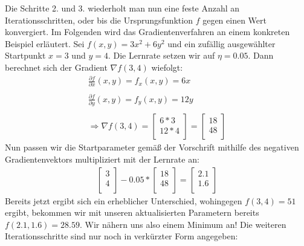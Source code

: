   \bigbreak\noindent
  Die Schritte 2. und 3. wiederholt man nun eine feste Anzahl an Iterationsschritten, oder bis die Ursprungsfunktion $f$ gegen einen Wert konvergiert.
  \bigbreak\noindent
  Im Folgenden wird das Gradientenverfahren an einem konkreten Beispiel erläutert.
  Sei $f(x,y) = 3x^2 + 6y^2$ und ein zufällig ausgewählter Startpunkt $x = 3$ und $y = 4$. 
  Die Lernrate setzen wir auf $\eta = 0.05$. Dann berechnet sich der Gradient $\nabla f(3,4)$ wiefolgt: 
  \begin{align*}
    \frac{\partial f}{\partial x}(x,y) = f_{x}(x,y) = 6x\\
    \\
    \frac{\partial f}{\partial y}(x,y) = f_{y}(x,y) = 12y\\
    \\
    \Rightarrow \nabla f(3,4) = \begin{bmatrix}
      6 * 3\\
      12 * 4\\
    \end{bmatrix} = \begin{bmatrix}
      18\\
      48\\
    \end{bmatrix}
  \end{align*}
  Nun passen wir die Startparameter gemäß der Vorschrift mithilfe des negativen Gradientenvektors multipliziert mit der Lernrate an: 
  \begin{align*}
    \begin{bmatrix}
      3\\
      4\\
    \end{bmatrix} - 0.05 * \begin{bmatrix}
      18\\
      48\\
    \end{bmatrix} = \begin{bmatrix}
      2.1\\
      1.6\\
    \end{bmatrix}
  \end{align*}
  Bereits jetzt ergibt sich ein erheblicher Unterschied, wohingegen $f(3,4) = 51$ ergibt, bekommen wir mit unseren aktualisierten Parametern bereits 
  $f(2.1, 1.6) = 28.59$. Wir nähern uns also einem Minimum an! Die weiteren Iterationsschritte sind nur noch in verkürzter Form angegeben:
